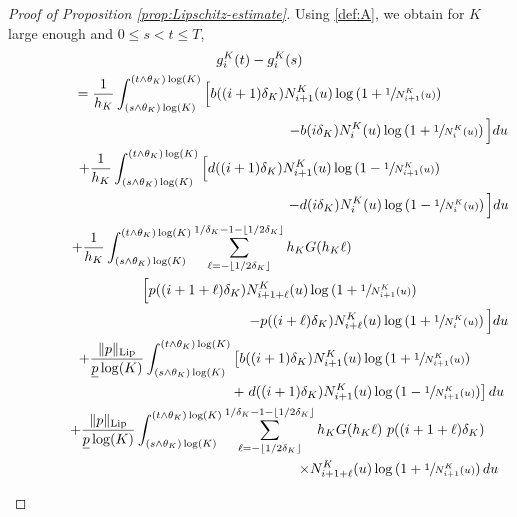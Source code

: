 \documentclass[10pt]{amsart}
\theoremstyle{plain}
\theoremstyle{remark}
\begin{document}
\begin{proof}[Proof of Proposition \ref{prop:Lipschitz-estimate}]
Using \eqref{def:A}, we obtain for $K$ large enough and $0\leq s<t\leq T$,
\begin{multline}\label{eq:horrible}
 g^K_{i}(t)-g^K_{i}(s) \\
 =\frac{1}{h_K}\int_{(s\wedge\theta_K)\log(K)}^{(t\wedge\theta_K)\log(K)}\Big[b((i+1)\delta_K)N^K_{i+1}(u) \log\left(1+\sfrac{1}{N^K_{i+1}(u)}\right)\\
 \hspace{7cm} -b(i\delta_K)N^K_{i}(u)
\log\left(1+\sfrac{1}{N^K_{i}(u)}\right)\Big] du \\
 +\frac{1}{h_K}\int_{(s\wedge\theta_K)\log(K)}^{(t\wedge\theta_K)\log(K)} \Big[d((i+1)\delta_K)N^K_{i+1}(u) \log\left(1-\sfrac{1}{N^K_{i+1}(u)}\right)\\
 \hspace{7cm} -d(i\delta_K)N^K_{i}(u)
\log\left(1-\sfrac{1}{N^K_{i}(u)}\right)\Big]du  \\
 \hspace*{-2.4cm}+\frac{1}{h_K}\int_{(s\wedge\theta_K)\log(K)}^{(t\wedge\theta_K)\log(K)} \sum_{\ell=-\lfloor 1/2\delta_K\rfloor}^{1/\delta_K-1-\lfloor 1/2\delta_K\rfloor} h_{K} G(h_{K}\ell)
\\
\hskip 1cm \Big[ p((i+1+\ell) \delta_{K})N^K_{i+1+\ell}(u)\log\left(1+\sfrac{1}{N^K_{i+1}(u)}\right)\\
 \hspace{6cm} -p((i+\ell) \delta_{K})N^K_{i+\ell}(u)\log\left(1+\sfrac{1}{N^K_{i}(u)}\right)\Big]du  \\
\hspace*{.8cm}+\frac{\|p\|_{\text{Lip}}}{\underline p\log(K)} \int_{(s\wedge\theta_K)\log(K)}^{(t\wedge\theta_K)\log(K)}\left[b((i+1)\delta_K)N^K_{i+1}(u) \log\left(1+\sfrac{1}{N^K_{i+1}(u)}\right)\right.\\
 \hspace{5.5cm}+\left. d((i+1)\delta_K)N^K_{i+1}(u) \log\left(1-\sfrac{1}{N^K_{i+1}(u)}\right)\right]du  \\
\hspace*{.9cm} +\frac{\|p\|_{\text{Lip}}}{\underline p\log(K)} \int_{(s\wedge\theta_K)\log(K)}^{(t\wedge\theta_K)\log(K)} \sum_{\ell=-\lfloor 1/2\delta_K\rfloor}^{1/\delta_K-1-\lfloor 1/2\delta_K\rfloor} h_{K} G(h_{K}\ell)\
p((i+1+\ell)\delta_K) \\
 \hspace{7cm} \times N^K_{i+1+\ell}(u)\log\left(1+\sfrac{1}{N^K_{i+1}(u)}\right)du
\end{multline}\vspace*{-3\baselineskip}
\begin{multline*}

\end{multline*}
\end{proof}
\end{document}

